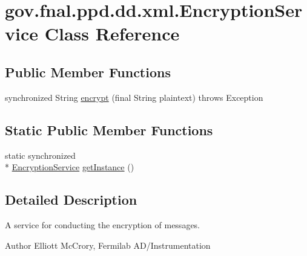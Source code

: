 \hypertarget{classgov_1_1fnal_1_1ppd_1_1dd_1_1xml_1_1EncryptionService}{\section{gov.\-fnal.\-ppd.\-dd.\-xml.\-Encryption\-Service Class Reference}
\label{classgov_1_1fnal_1_1ppd_1_1dd_1_1xml_1_1EncryptionService}
}
\subsection*{Public Member Functions}
\begin{DoxyCompactItemize}
\item 
synchronized String \hyperlink{classgov_1_1fnal_1_1ppd_1_1dd_1_1xml_1_1EncryptionService_acc22895b4cdbfad7241cb9aef7e44386}{encrypt} (final String plaintext)  throws Exception 
\end{DoxyCompactItemize}
\subsection*{Static Public Member Functions}
\begin{DoxyCompactItemize}
\item 
static synchronized \\*
\hyperlink{classgov_1_1fnal_1_1ppd_1_1dd_1_1xml_1_1EncryptionService}{Encryption\-Service} \hyperlink{classgov_1_1fnal_1_1ppd_1_1dd_1_1xml_1_1EncryptionService_af86ad51ad97df1cb699364bb83322da5}{get\-Instance} ()
\end{DoxyCompactItemize}


\subsection{Detailed Description}
A service for conducting the encryption of messages.

\begin{DoxyAuthor}{Author}
Elliott Mc\-Crory, Fermilab A\-D/\-Instrumentation 
\end{DoxyAuthor}


